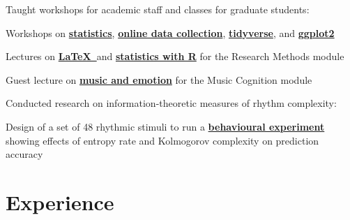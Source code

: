 \documentclass[]{deedy-resume-openfont}
\begin{document}
\begin{minipage}[t]{0.66\textwidth}
Taught workshops for academic staff and classes for graduate students:
\begin{tightemize}
\item Workshops on \textbf{\href{https://github.com/remidefleurian/teaching/tree/master/lectures/intro-to-stats}{statistics}}, \textbf{\href{https://github.com/remidefleurian/teaching/tree/master/lectures/online-data-collection}{online data collection}}, \textbf{\href{https://github.com/remidefleurian/teaching/tree/master/lectures/intro-to-tidyverse}{tidyverse}}, and \textbf{\href{https://github.com/remidefleurian/teaching/tree/master/lectures/intro-to-ggplot2}{ggplot2}}
\item Lectures on \textbf{\href{https://github.com/remidefleurian/teaching/tree/master/lectures/typesetting-with-latex}{\LaTeX\ }}and \textbf{\href{https://github.com/remidefleurian/teaching/tree/master/lectures/stats-with-r}{statistics with R}} for the Research Methods module 
\item Guest lecture on \textbf{\href{https://github.com/remidefleurian/teaching/tree/master/lectures/music-and-emotion}{music and emotion}} for the Music Cognition module
\end{tightemize}
\sectionsep

Conducted research on information-theoretic measures of rhythm complexity: 
\begin{tightemize}
\item Design of a set of 48 rhythmic stimuli to run a  \href{https://remidefleurian.com/publication/2017-cognsci/}{\bf behavioural experiment} showing effects of entropy rate and Kolmogorov complexity on prediction accuracy
\end{tightemize}
\sectionsep

\sectionsep

\section{Experience}


\end{minipage}
\end{document}
